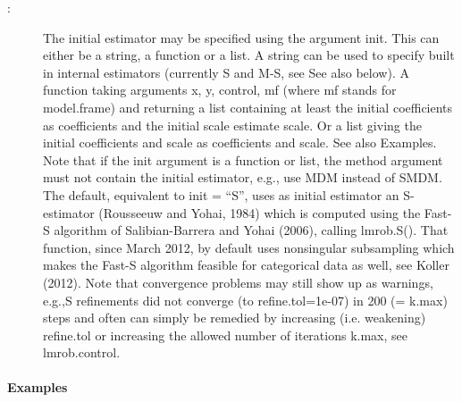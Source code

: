 \documentclass[letterpaper,10pt,english]{sphinxmanual}
\begin{document}
\begin{fulllineitems}
\begin{description}
\item[{ :}] \leavevmode
The initial estimator may be specified using the argument init. This
can either be a string, a function or a list. A string can be used to
specify built in internal estimators (currently S and M-S, see See also
below). A function taking arguments x, y, control, mf
(where mf stands for model.frame) and returning a list containing at least
the initial coefficients as coefficients and the initial scale estimate
scale. Or a list giving the initial coefficients and scale as coefficients
and scale. See also Examples. Note that if the init argument is a function
or list, the method argument must not contain the initial estimator, e.g.,
use MDM instead of SMDM.
The default, equivalent to init = “S”, uses as initial estimator an
S-estimator (Rousseeuw and Yohai, 1984) which is computed using the
Fast-S algorithm of Salibian-Barrera and Yohai (2006), calling lmrob.S().
That function, since March 2012, by default uses nonsingular subsampling
which makes the Fast-S algorithm feasible for categorical data as well,
see Koller (2012). Note that convergence problems may still show up as
warnings, e.g.,S refinements did not converge (to refine.tol=1e-07) in
200 (= k.max) steps and often can simply be remedied by increasing
(i.e. weakening) refine.tol or increasing the allowed number of iterations
k.max, see lmrob.control.

\end{description}
\paragraph{Examples}


\end{fulllineitems}
\end{document}
